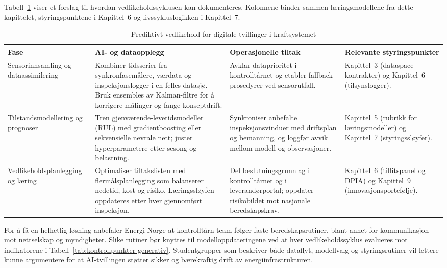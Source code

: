 Tabell~\ref{tab:vedlikehold-kraft} viser et forslag til hvordan vedlikeholdssyklusen kan dokumenteres. Kolonnene binder sammen læringsmodellene fra dette kapittelet, styringspunktene i Kapittel~6 og livssykluslogikken i Kapittel~7.

\begin{table}[htbp]
    \centering
    \caption{Prediktivt vedlikehold for digitale tvillinger i kraftsystemet}
    \label{tab:vedlikehold-kraft}
    \begin{tabular}{p{3.6cm}p{4.4cm}p{3.6cm}p{3.6cm}}
        \toprule
        \textbf{Fase} & \textbf{AI- og dataopplegg} & \textbf{Operasjonelle tiltak} & \textbf{Relevante styringspunkter} \\
        \midrule
        Sensorinnsamling og dataassimilering & Kombiner tidsserier fra synkronfasemålere, værdata og inspeksjonslogger i en felles datasjø. Bruk ensembles av Kalman-filtre for å korrigere målinger og fange konseptdrift. & Avklar dataprioritet i kontrolltårnet og etabler fallback-prosedyrer ved sensorutfall. & Kapittel~3 (dataspace-kontrakter) og Kapittel~6 (tilsynslogger). \\
        \addlinespace
        Tilstandsmodellering og prognoser & Tren gjenværende-levetidsmodeller (RUL) med gradientboosting eller sekvensielle nevrale nett; juster hyperparametere etter sesong og belastning. & Synkroniser anbefalte inspeksjonsvinduer med driftsplan og bemanning, og loggfør avvik mellom modell og observasjoner. & Kapittel~5 (rubrikk for læringsmodeller) og Kapittel~7 (styringssløyfer). \\
        \addlinespace
        Vedlikeholdsplanlegging og læring & Optimaliser tiltakslisten med flermålsplanlegging som balanserer nedetid, kost og risiko. Læringssløyfen oppdateres etter hver gjennomført inspeksjon. & Del beslutningsgrunnlag i kontrolltårnet og i leverandørportal; oppdater risikobildet mot nasjonale beredskapskrav. & Kapittel~6 (tillitspanel og DPIA) og Kapittel~9 (innovasjonsportefølje). \\
        \bottomrule
    \end{tabular}
\end{table}

For å få en helhetlig løsning anbefaler Energi Norge at kontrolltårn-team følger faste beredskapsrutiner, blant annet for kommunikasjon mot nettselskap og myndigheter.\citep{energinorge2023beredskap} Slike rutiner bør knyttes til modelloppdateringene ved at hver vedlikeholdssyklus evalueres mot indikatorene i Tabell~\ref{tab:kontrollpunkter-generativ}. Studentgrupper som beskriver både dataflyt, modellvalg og styringsrutiner vil lettere kunne argumentere for at AI-tvillingen støtter sikker og bærekraftig drift av energiinfrastrukturen.


